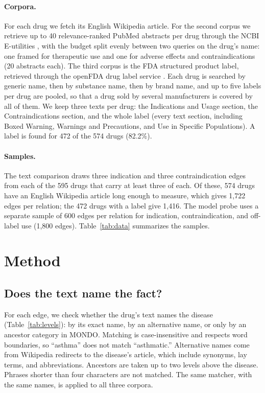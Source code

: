 \documentclass[letterpaper]{article} %
\begin{document}
\paragraph{Corpora.}
For each drug we fetch its English Wikipedia article. For the second corpus we
retrieve up to 40 relevance-ranked PubMed abstracts per drug through the NCBI
E-utilities \citep{sayers2009eutils}, with the budget split evenly between two
queries on the drug's name: one framed for therapeutic use and one for adverse
effects and contraindications (20 abstracts each). The third corpus is the FDA
structured product label, retrieved through the openFDA drug label service
\citep{kasshout2016openfda}. Each drug is searched by generic name, then by
substance name, then by brand name, and up to five labels per drug are pooled,
so that a drug sold by several manufacturers is covered by all of them. We keep
three texts per drug: the Indications and Usage section, the Contraindications
section, and the whole label (every text section, including Boxed Warning,
Warnings and Precautions, and Use in Specific Populations). A label is found for
472 of the 574 drugs (82.2\%).

\paragraph{Samples.}
The text comparison draws three indication and three contraindication edges
from each of the 595 drugs that carry at least three of each. Of these, 574
drugs have an English Wikipedia article long enough to measure, which gives
1,722 edges per relation; the 472 drugs with a label give 1,416. The model
probe uses a separate sample of 600 edges per relation for indication,
contraindication, and off-label use (1,800 edges). Table~\ref{tab:data}
summarizes the samples.

\section{Method}

\subsection{Does the text name the fact?}

For each edge, we check whether the drug's text names the disease
(Table~\ref{tab:levels}): by its exact name, by an alternative name, or only by
an ancestor category in MONDO. Matching is case-insensitive and respects word
boundaries, so ``asthma'' does not match ``asthmatic.'' Alternative names come
from Wikipedia redirects to the disease's article, which include synonyms, lay
terms, and abbreviations. Ancestors are taken up to two levels above the
disease. Phrases shorter than four characters are not matched. The same
matcher, with the same names, is applied to all three corpora.
\end{document}
